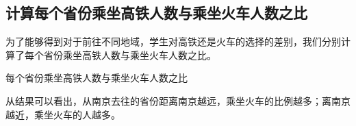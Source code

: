 \documentclass{ctexart}
\newcounter{sub}
\begin{document}
\subsection{计算每个省份乘坐高铁人数与乘坐火车人数之比}
为了能够得到对于前往不同地域，学生对高铁还是火车的选择的差别，我们分别计算了每个省份乘坐高铁人数与乘坐火车人数之比。
\begin{table}[H]
	\centering
	\caption{每个省份乘坐高铁人数与乘坐火车人数之比}
\end{table}

从结果可以看出，从南京去往的省份距离南京越远，乘坐火车的比例越多；离南京越近，乘坐火车的人越多。
\end{document}
